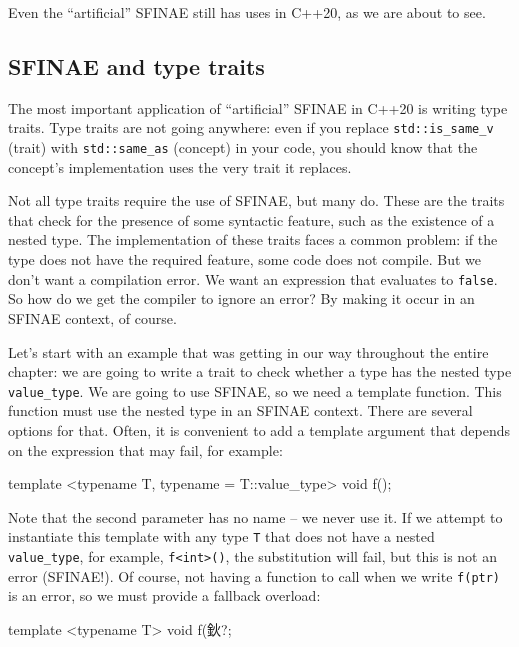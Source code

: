 Even the ``artificial'' SFINAE still has uses in C++20, as we are about to see.

\subsection{SFINAE and type traits}

The most important application of ``artificial'' SFINAE in C++20 is writing type traits. Type traits are not going anywhere: even if you replace \texttt{std::is\_same\_v} (trait) with \texttt{std::same\_as} (concept) in your code, you should know that the concept's implementation uses the very trait it replaces.

Not all type traits require the use of SFINAE, but many do. These are the traits that check for the presence of some syntactic feature, such as the existence of a nested type. The implementation of these traits faces a common problem: if the type does not have the required feature, some code does not compile. But we don't want a compilation error. We want an expression that evaluates to \texttt{false}. So how do we get the compiler to ignore an error? By making it occur in an SFINAE context, of course.

Let's start with an example that was getting in our way throughout the entire chapter: we are going to write a trait to check whether a type has the nested type \texttt{value\_type}. We are going to use SFINAE, so we need a template function. This function must use the nested type in an SFINAE context. There are several options for that. Often, it is convenient to add a template argument that depends on the expression that may fail, for example:

\begin{code}
template <typename T, typename = T::value_type> void f();
\end{code}

Note that the second parameter has no name -- we never use it. If we attempt to instantiate this template with any type \texttt{T} that does not have a nested \texttt{value\_type}, for example, \texttt{f\textless{}int\textgreater{}()}, the substitution will fail, but this is not an error (SFINAE!). Of course, not having a function to call when we write \texttt{f(ptr)} is an error, so we must provide a fallback overload:

\begin{code}
template <typename T> void f(鈥?;
\end{code}

